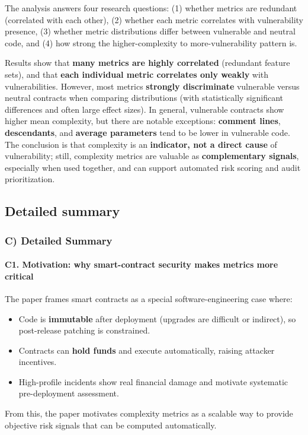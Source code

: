 \documentclass[11pt,a4paper]{article}
\begin{document}
The analysis answers four research questions: (1) whether metrics are redundant (correlated with each other), (2) whether each metric correlates with vulnerability presence, (3) whether metric distributions differ between vulnerable and neutral code, and (4) how strong the higher-complexity to more-vulnerability pattern is.

Results show that \textbf{many metrics are highly correlated} (redundant feature sets), and that \textbf{each individual metric correlates only weakly} with vulnerabilities. However, most metrics \textbf{strongly discriminate} vulnerable versus neutral contracts when comparing distributions (with statistically significant differences and often large effect sizes). In general, vulnerable contracts show higher mean complexity, but there are notable exceptions: \textbf{comment lines}, \textbf{descendants}, and \textbf{average parameters} tend to be lower in vulnerable code. The conclusion is that complexity is an \textbf{indicator, not a direct cause} of vulnerability; still, complexity metrics are valuable as \textbf{complementary signals}, especially when used together, and can support automated risk scoring and audit prioritization.

\subsection{Detailed summary}
\subsubsection*{C) Detailed Summary}
\paragraph{C1. Motivation: why smart-contract security makes metrics more critical}
The paper frames smart contracts as a special software-engineering case where:
\begin{itemize}[leftmargin=*]
  \item Code is \textbf{immutable} after deployment (upgrades are difficult or indirect), so post-release patching is constrained.
  \item Contracts can \textbf{hold funds} and execute automatically, raising attacker incentives.
  \item High-profile incidents show real financial damage and motivate systematic pre-deployment assessment.
\end{itemize}
From this, the paper motivates complexity metrics as a scalable way to provide objective risk signals that can be computed automatically.
\end{document}
